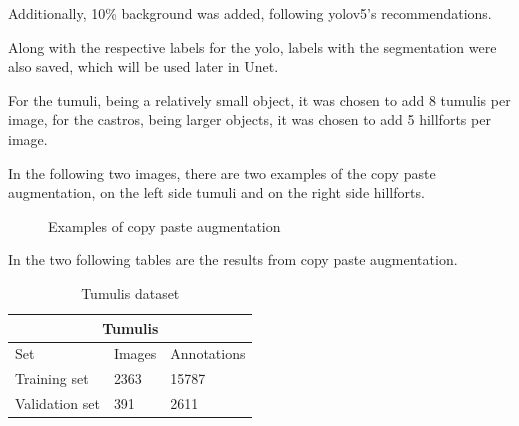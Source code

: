 Additionally, 10\% background was added, following yolov5's recommendations.

Along with the respective labels for the yolo, labels with the segmentation were also saved, which will be used later in Unet.

For the tumuli, being a relatively small object, it was chosen to add 8 tumulis per image, for the castros, being larger objects, it was chosen to add 5 hillforts per image.

In the following two images, there are two examples of the copy paste augmentation, on the left side tumuli and on the right side hillforts.
\begin{figure}[H]
    \centering
    \qquad
    \caption{Examples of copy paste augmentation}%
\end{figure}

In the two following tables are the results from copy paste augmentation.

\begin{table}[H]
\centering
\begin{tabular}{|p{3cm}|p{2.5cm}|p{2cm}|} 
\hline
\multicolumn{3}{|c|}{Tumulis} \\
 \hline
  Set & Images & Annotations\\ [0.5ex] 
 \hline
 Training set & 2363 & 15787 \\ 
 Validation set & 391 & 2611  \\[1ex]
 \hline
\end{tabular}
\caption{Tumulis dataset}
\end{table} 

